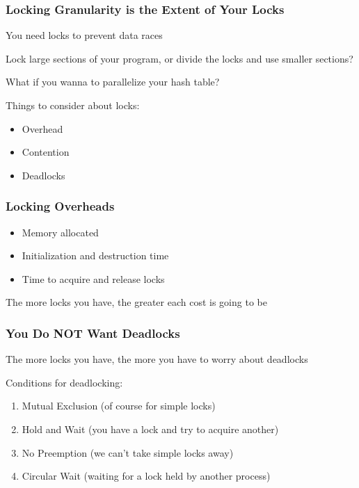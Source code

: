   \begin{frame}
    \frametitle{Locking Granularity is the Extent of Your Locks}

    You need locks to prevent data races

    \vspace{2em}

    Lock large sections of your program, or divide the locks and
    use smaller sections?

    \hspace{2em} What if you wanna to parallelize your hash table?

    \vspace{2em}
    
    Things to consider about locks:

    \begin{itemize}
     \item Overhead
      \item Contention
      \item Deadlocks
    \end{itemize}
  \end{frame}

  \begin{frame}
    \frametitle{Locking Overheads}

    \begin{itemize}
      \item Memory allocated
      \item Initialization and destruction time
      \item Time to acquire and release locks
    \end{itemize}

    \vspace{2em}

    The more locks you have, the greater each cost is going to be
  \end{frame}

  \begin{frame}
    \frametitle{You Do NOT Want Deadlocks}

    The more locks you have, the more you have to worry about deadlocks

    \vspace{2em}

    Conditions for deadlocking:

    \begin{enumerate}
      \item Mutual Exclusion (of course for simple locks)
      \item Hold and Wait (you have a lock and try to acquire another)
      \item No Preemption (we can't take simple locks away)
      \item Circular Wait (waiting for a lock held by another process)
    \end{enumerate}
  \end{frame}

